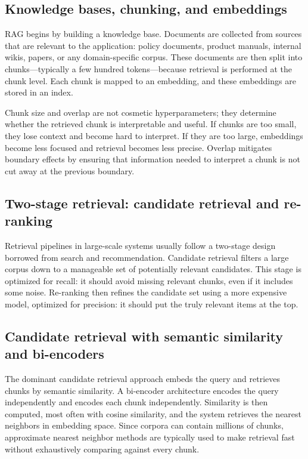 \subsection{Knowledge bases, chunking, and embeddings}
RAG begins by building a knowledge base. Documents are collected from sources that are relevant to the application: policy documents, product manuals, internal wikis, papers, or any domain-specific corpus. These documents are then split into chunks—typically a few hundred tokens—because retrieval is performed at the chunk level. Each chunk is mapped to an embedding, and these embeddings are stored in an index.

Chunk size and overlap are not cosmetic hyperparameters; they determine whether the retrieved chunk is interpretable and useful. If chunks are too small, they lose context and become hard to interpret. If they are too large, embeddings become less focused and retrieval becomes less precise. Overlap mitigates boundary effects by ensuring that information needed to interpret a chunk is not cut away at the previous boundary.

\subsection{Two-stage retrieval: candidate retrieval and re-ranking}
Retrieval pipelines in large-scale systems usually follow a two-stage design borrowed from search and recommendation. Candidate retrieval filters a large corpus down to a manageable set of potentially relevant candidates. This stage is optimized for recall: it should avoid missing relevant chunks, even if it includes some noise. Re-ranking then refines the candidate set using a more expensive model, optimized for precision: it should put the truly relevant items at the top.

\subsection{Candidate retrieval with semantic similarity and bi-encoders}
The dominant candidate retrieval approach embeds the query and retrieves chunks by semantic similarity. A bi-encoder architecture encodes the query independently and encodes each chunk independently. Similarity is then computed, most often with cosine similarity, and the system retrieves the nearest neighbors in embedding space. Since corpora can contain millions of chunks, approximate nearest neighbor methods are typically used to make retrieval fast without exhaustively comparing against every chunk.

